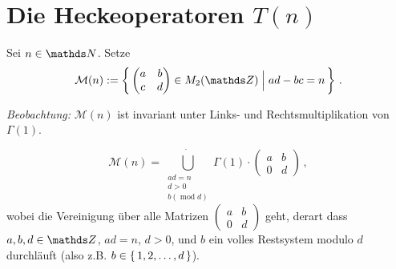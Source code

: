 \section{Die Heckeoperatoren $T(n)$}

\begin{defi}
Sei $n \in \NN$. Setze 
\[
\mathcal M(n) := \Set{ \abcd \in M_2(\ZZ) \Bigm| ad - bc = n }
\,.
\]
\end{defi}

\emph{Beobachtung:} $\mathcal M(n)$ ist invariant unter Links- und Rechtsmultiplikation von $\Gamma (1)$. 

\begin{lemm}
\[
\mathcal M (n) = \dot{\bigcup_{\substack{ad = n\\ d > 0\\
b (\operatorname{mod} d)}}} \Gamma(1) \cdot 
\begin{pmatrix}
a & b\\
0 & d
\end{pmatrix}
\,,
\]
wobei die Vereinigung über alle Matrizen $\begin{pmatrix}a&b\\0&d\end{pmatrix}$ geht, derart dass $a,b,d \in \ZZ$, $ad = n$, $d > 0$, und $b$ ein volles Restsystem modulo $d$ durchläuft (also z.B. $b \in \left\{\,1, 2, \ldots, d\,\right\}$).
\end{lemm}

